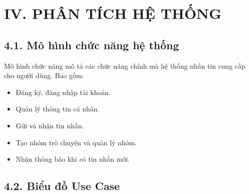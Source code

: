 \documentclass[12pt,a4paper]{article}
\begin{document}
	\vspace{0.5cm}
	
	\section*{IV. PHÂN TÍCH HỆ THỐNG}
	\vspace{0.5cm}
	
	\subsection*{4.1. Mô hình chức năng hệ thống}
	\vspace{0.1cm}
	
	\noindent
	Mô hình chức năng mô tả các chức năng chính mà hệ thống nhắn tin cung cấp cho người dùng. Bao gồm:
	\begin{itemize}
		\item Đăng ký, đăng nhập tài khoản.
		\item Quản lý thông tin cá nhân.
		\item Gửi và nhận tin nhắn.
		\item Tạo nhóm trò chuyện và quản lý nhóm.
		\item Nhận thông báo khi có tin nhắn mới.
	\end{itemize}
	
	\vspace{0.7cm}
	
	\subsection*{4.2. Biểu đồ Use Case}
	\vspace{0.1cm}
	
\end{document}
